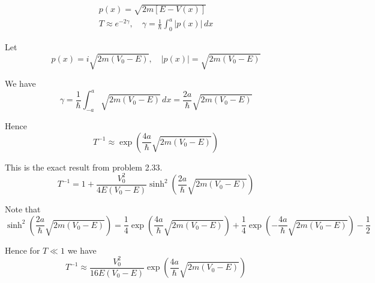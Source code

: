 


\bigskip
\begin{gather*}
p(x)=\sqrt{2m[E-V(x)]}\tag{9.2}
\\
T\approx e^{-2\gamma},\quad\gamma=\frac{1}{\hbar}
\int_0^a|p(x)|\,dx\tag{9.23}
\end{gather*}

Let
\begin{equation*}
p(x)=i\sqrt{2m(V_0-E)},\quad|p(x)|=\sqrt{2m(V_0-E)}
\end{equation*}

We have
\begin{equation*}
\gamma=\frac{1}{\hbar}\int_{-a}^a\sqrt{2m(V_0-E)}\,dx=\frac{2a}{\hbar}\sqrt{2m(V_0-E)}
\end{equation*}

Hence
\begin{equation*}
T^{-1}\approx\exp\left(\frac{4a}{\hbar}\sqrt{2m(V_0-E)}\right)\tag{1}
\end{equation*}

This is the exact result from problem 2.33.
\begin{equation*}
T^{-1}=1+\frac{V_0^2}{4E(V_0-E)}\sinh^2\left(\frac{2a}{\hbar}\sqrt{2m(V_0-E)}\right)
\end{equation*}

Note that
\begin{equation*}
\sinh^2\left(\frac{2a}{\hbar}\sqrt{2m(V_0-E)}\right)
=\frac{1}{4}\exp\left(\frac{4a}{\hbar}\sqrt{2m(V_0-E)}\right)
+\frac{1}{4}\exp\left(-\frac{4a}{\hbar}\sqrt{2m(V_0-E)}\right)-\frac{1}{2}
\end{equation*}

Hence for $T\ll1$ we have
\begin{equation*}
T^{-1}\approx\frac{V_0^2}{16E(V_0-E)}\exp\left(\frac{4a}{\hbar}\sqrt{2m(V_0-E)}\right)
\end{equation*}


